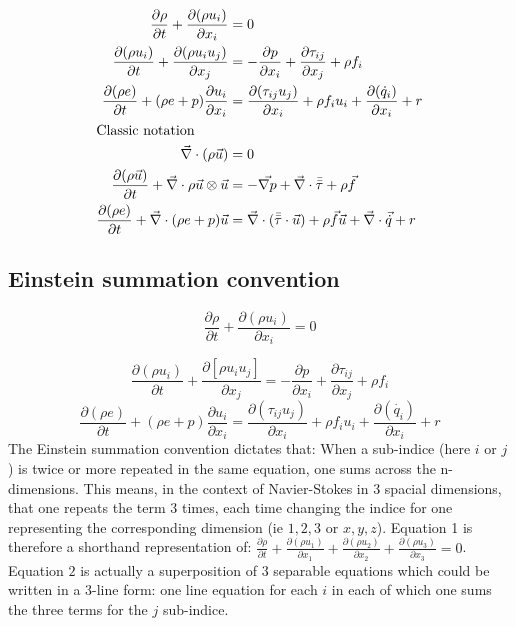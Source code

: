 \begin{align}
      \pdv{\rho}{t}+\pdv{(\rho u_i)}{x_i} &= 0 \\
      \pdv{(\rho u_i)}{t}+\pdv{(\rho u_i u_j)}{x_j} &= -\pdv{p}{x_i}+\pdv{\tau_{ij}}{x_j}+\rho f_i \\
      \pdv{(\rho e)}{t}+(\rho e+p)\pdv{u_i}{x_i} &= \pdv{(\tau_{ij} u_j)}{x_i}+\rho f_i u_i+\pdv{(\dot{q}_i)}{x_i}+r \\
      \intertext{Classic notation}
      \vec{\nabla}\cdot(\rho\vec{u}) &= 0 \\
      \pdv{(\rho \vec{u})}{t}+\vec{\nabla}\cdot\rho\vec{u}\otimes\vec{u} &= -\vec{\nabla p}+\vec{\nabla}\cdot\Bar{\Bar{\tau}}+\rho\vec{f} \\
      \pdv{(\rho e)}{t}+\vec{\nabla}\cdot(\rho e+p)\vec{u} &= \vec{\nabla}\cdot(\Bar{\Bar{\tau}}\cdot\vec{u})+\rho\vec{f}\vec{u}+\vec{\nabla}\cdot\vec{\dot{q}}+r 
    \end{align}

\subsection{Einstein summation convention}

\begin{equation}
\frac{\partial \rho}{\partial t} + \frac{\partial(\rho u_{i})}{\partial x_{i}} = 0
\end{equation}

\begin{equation}
\frac{\partial (\rho u_{i})}{\partial t} + \frac{\partial[\rho u_{i}u_{j}]}{\partial x_{j}} = -\frac{\partial p}{\partial x_{i}} + \frac{\partial \tau_{ij}}{\partial x_{j}} + \rho f_{i} \end{equation}
\begin{equation}
\frac{\partial (\rho e)}{\partial t} + (\rho e+p)\frac{\partial u_{i}}{\partial x_{i}} = \frac{\partial(\tau_{ij}u_{j})}{\partial x_{i}} + \rho f_{i}u_{i} + \frac{\partial(\dot{ q_{i}})}{\partial x_{i}} + r \end{equation}
The Einstein summation convention dictates that: When a sub-indice (here $i$ or $j$) is twice or more repeated in the same equation, one sums across the n-dimensions. 
This means, in the context of Navier-Stokes in 3 spacial dimensions, that one repeats the term 3 times, each time changing the indice for one representing the corresponding dimension (ie $1,2,3$ or $x,y,z$). Equation 1 is therefore a shorthand representation of: $\frac{\partial \rho}{\partial t}+\frac{\partial(\rho u_{1})}{\partial x_{1}}+\frac{\partial(\rho u_{2})}{\partial x_{2}}+ \frac{\partial(\rho u_{3})}{\partial x_{3}}=0$.
Equation $2$ is actually a superposition of 3 separable equations which could be written in a 3-line form: one line equation for each $i$ in each of which one sums the three terms for the $j$ sub-indice.
